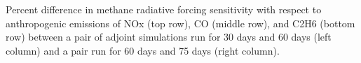 Percent difference in methane radiative forcing sensitivity with respect to anthropogenic emissions of NOx (top row), CO (middle row), and C2H6 (bottom row) between a pair of adjoint simulations run for 30 days and 60 days (left column) and a pair run for 60 days and 75 days (right column). \label{fig:diffwindow}